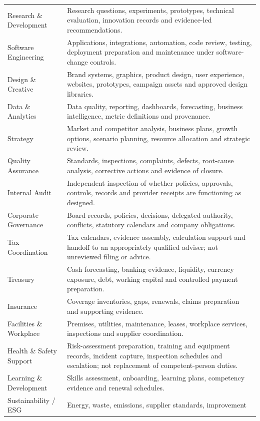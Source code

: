 \begin{longtable}{@{}p{}p{}@{}}
Research \& Development & Research questions, experiments, prototypes,
technical evaluation, innovation records and evidence-led recommendations. \\
Software Engineering & Applications, integrations, automation, code review,
testing, deployment preparation and maintenance under software-change controls. \\
Design \& Creative & Brand systems, graphics, product design, user experience,
websites, prototypes, campaign assets and approved design libraries. \\
Data \& Analytics & Data quality, reporting, dashboards, forecasting, business
intelligence, metric definitions and provenance. \\
Strategy & Market and competitor analysis, business plans, growth options,
scenario planning, resource allocation and strategic review. \\
Quality Assurance & Standards, inspections, complaints, defects, root-cause
analysis, corrective actions and evidence of closure. \\
Internal Audit & Independent inspection of whether policies, approvals,
controls, records and provider receipts are functioning as designed. \\
Corporate Governance & Board records, policies, decisions, delegated authority,
conflicts, statutory calendars and company obligations. \\
Tax Coordination & Tax calendars, evidence assembly, calculation support and
handoff to an appropriately qualified adviser; not unreviewed filing or advice. \\
Treasury & Cash forecasting, banking evidence, liquidity, currency exposure,
debt, working capital and controlled payment preparation. \\
Insurance & Coverage inventories, gaps, renewals, claims preparation and
supporting evidence. \\
Facilities \& Workplace & Premises, utilities, maintenance, leases, workplace
services, inspections and supplier coordination. \\
Health \& Safety Support & Risk-assessment preparation, training and equipment
records, incident capture, inspection schedules and escalation; not replacement
of competent-person duties. \\
Learning \& Development & Skills assessment, onboarding, learning plans,
competency evidence and renewal schedules. \\
Sustainability / ESG & Energy, waste, emissions, supplier standards, improvement

\end{longtable}
